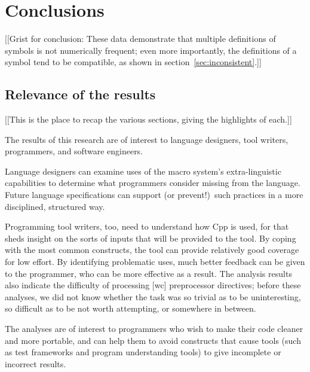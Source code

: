 \documentclass[10pt]{article}
\begin{document}
\section{Conclusions}
\label{sec:conclusion}

[[Grist for conclusion: These data demonstrate that multiple definitions of
symbols is not numerically frequent; even more importantly, the definitions
of a symbol tend to be compatible, as shown in
section~\ref{sec:inconsistent}.]]


\subsection{Relevance of the results}

[[This is the place to recap the various sections, giving the highlights of
each.]]

The results of this research are of interest to language designers, tool
writers, programmers, and software engineers.

Language designers can examine uses of the macro system's extra-linguistic
capabilities to determine what programmers consider missing from the
language.  Future language specifications can support (or prevent!)\ such
practices in a more disciplined, structured way.


Programming tool writers, too, need to understand how Cpp is used, for that
sheds insight on the sorts of inputs that will be provided to the tool.  By
coping with the most common constructs, the tool can provide relatively
good coverage for low effort.  By identifying problematic uses, much better
feedback can be given to the programmer, who can be more effective as a
result.  The analysis results also indicate the difficulty of processing [wc]
preprocessor directives; before these analyses, we did not know whether the
task was so trivial as to be uninteresting, so difficult as to be not worth
attempting, or somewhere in between.

The analyses are of interest to programmers who wish to make their code
cleaner and more portable, and can help them to avoid constructs that cause
tools (such as test frameworks and program understanding tools)
to give incomplete or incorrect results.
\end{document}
